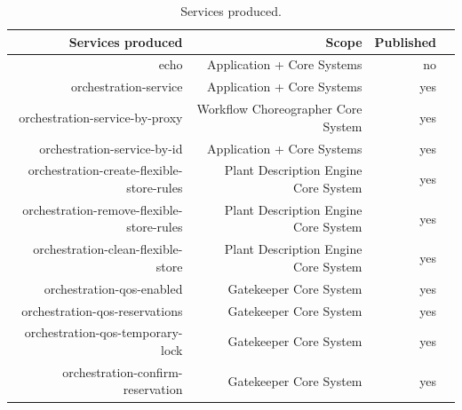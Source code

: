 \documentclass[a4paper]{arrowhead}
\begin{document}
\begin{table}[ht!]
  \centering
  \caption{Services produced. }
  \label{tab:services}
  \begin{tabular}{|r|r|r|r|}
    \hline
    \rowcolor{gray!33}\textbf{Services produced} & \textbf{Scope} & \textbf{Published} \\
    \hline
 
    echo & Application + Core Systems & no  \\ \hline
    orchestration-service & Application + Core Systems & yes \\ \hline
    orchestration-service-by-proxy & Workflow Choreographer Core System & yes \\ \hline
    orchestration-service-by-id & Application + Core Systems & yes \\ \hline
    orchestration-create-flexible-store-rules & Plant Description Engine Core System & yes \\ \hline
    orchestration-remove-flexible-store-rules & Plant Description Engine Core System & yes \\ \hline
    orchestration-clean-flexible-store & Plant Description Engine Core System & yes \\ \hline
    orchestration-qos-enabled & Gatekeeper Core System & yes \\ \hline
    orchestration-qos-reservations & Gatekeeper Core System & yes \\ \hline
    orchestration-qos-temporary-lock & Gatekeeper Core System & yes \\ \hline
    orchestration-confirm-reservation & Gatekeeper Core System & yes \\ \hline
  \end{tabular}
\end{table}
\end{document}
